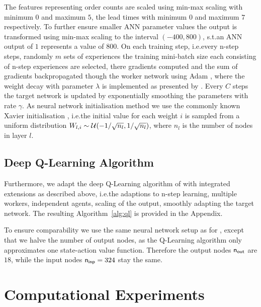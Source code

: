 \documentclass[envcountsame]{llncs}
\begin{document}
The features representing order counts are scaled using min-max scaling with minimum \(0\) and
maximum \(5\), the lead times with minimum \(0\) and maximum \(7\) respectively.
To further ensure smaller ANN parameter values the output is transformed using min-max scaling to
the interval \((-400, 800)\), s.t.\@ an ANN output of \(1\) represents a value of \(800\).
%
On each training step, i.e.\@ every n-step steps, randomly \(m\) sets of experiences the training
mini-batch size each consisting of n-step experiences are selected, there gradients computed and the
sum of gradients backpropagated though the worker network using Adam \citep{kingma2014adam}, where
the weight decay with parameter \(\lambda\) is implemented as presented by
\citet{loshchilov2017decoupled}.
%
Every \(C\) steps the target network is updated by exponentially smoothing the parameters with rate
\(\gamma\).
%
As neural network
initialisation method we use the commonly known Xavier initialisation
\citep{glorot2010understanding}, i.e.\@ the initial value for each weight \(i\) is sampled from a
uniform distribution \(W_{l,i} \sim \mathcal{U}(-1/\sqrt{n_l},1/\sqrt{n_l})\), where \(n_{l}\) is the
number of nodes in layer \(l\).
%


\subsection{Deep Q-Learning Algorithm}

Furthermore, we adapt the deep Q-Learning algorithm of \citet{mnih2015human} with integrated
extensions as described above, i.e.\@ the adaptions to n-step learning, multiple workers,
independent agents, scaling of the output, smoothly adapting the target network. The resulting
Algorithm~\ref{alg:ql} is provided in the Appendix.

To ensure comparability we use the same neural network setup as for \ARA{}, except that we halve the
number of output nodes, as the Q-Learning algorithm only approximates one state-action value
function. Therefore the output nodes \(\mathsf{n_{out}}\) are \(18\), while the input nodes \(\mathsf{n_{inp}}=324\)
stay the same.


\section{Computational Experiments}
\label{sec:Preliminary}
\end{document}
